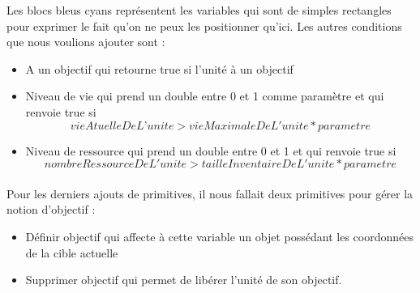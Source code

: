 \documentclass{report}
\begin{document}
Les blocs bleus cyans représentent les variables qui sont de simples rectangles pour exprimer le fait qu’on ne peux les positionner qu’ici. \newline
Les autres conditions que nous voulions ajouter sont :
\begin{itemize}
\item A un objectif qui retourne true si l’unité à un objectif
\item Niveau de vie qui prend un double entre 0 et 1 comme paramètre et qui renvoie true si 
\[
vie Atuelle De L’unite > vie Maximale De L'unite * parametre
\]
\item Niveau de ressource qui prend un double entre 0 et 1 et qui renvoie true si 
\[
nombre Ressource De L'unite > taille Inventaire De L'unite * parametre
\]
\end{itemize}
\paragraph{}
  Pour les derniers ajouts de primitives, il nous fallait deux primitives pour gérer la notion d’objectif :
  \begin{itemize}
\item Définir objectif qui affecte à cette variable un objet possédant les coordonnées de la cible actuelle
\item Supprimer objectif qui permet de libérer l’unité de son objectif.
\end{itemize}
\paragraph{}
\end{document}
